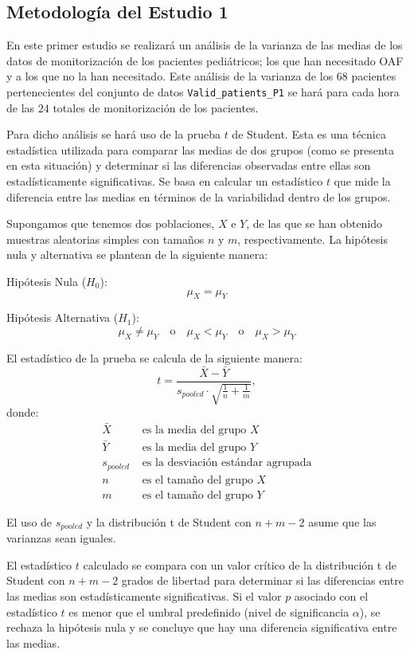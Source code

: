 \subsection{Metodología del Estudio 1}\label{sec:metodologia-estudio-1}

En este primer estudio se realizará un análisis de la varianza de las medias de los datos de monitorización de los pacientes pediátricos; los que han necesitado OAF y a los que no la han necesitado. Este análisis de la varianza de los $68$ pacientes pertenecientes del conjunto de datos \texttt{Valid\_patients\_P1} se hará para cada hora de las $24$ totales de monitorización de los pacientes.

Para dicho análisis se hará uso de la prueba $t$ de Student. Esta es una técnica estadística utilizada para comparar las medias de dos grupos (como se presenta en esta situación) y determinar si las diferencias observadas entre ellas son estadísticamente significativas. Se basa en calcular un estadístico $t$ que mide la diferencia entre las medias en términos de la variabilidad dentro de los grupos.

Supongamos que tenemos dos poblaciones, $X$ e $Y$, de las que se han obtenido muestras aleatorias simples con tamaños $n$ y $m$, respectivamente. La hipótesis nula y alternativa se plantean de la siguiente manera:

Hipótesis Nula ($H_0$):
\[
\mu_X = \mu_Y
\]

Hipótesis Alternativa ($H_1$):
\[
\mu_X \neq \mu_Y \quad \text{o} \quad \mu_X < \mu_Y \quad \text{o} \quad \mu_X > \mu_Y
\]

El estadístico de la prueba se calcula de la siguiente manera:
\[
t = \frac{\bar{X} - \bar{Y}}{s_{pooled} \cdot \sqrt{\frac{1}{n} + \frac{1}{m}}},
\]
donde:
\begin{align*}
\bar{X} & \text{ es la media del grupo } X \\
\bar{Y} & \text{ es la media del grupo } Y \\
s_{pooled} & \text{ es la desviación estándar agrupada} \\
n & \text{ es el tamaño del grupo } X \\
m & \text{ es el tamaño del grupo } Y
\end{align*}

{\color{blue} El uso de $s_{pooled}$ y la distribución t de Student con $n+m-2$ asume que las varianzas sean iguales.}

El estadístico $t$ calculado se compara con un valor crítico de la distribución t de Student con $n+m-2$ grados de libertad para determinar si las diferencias entre las medias son estadísticamente significativas. Si el valor $p$ asociado con el estadístico $t$ es menor que el umbral predefinido (nivel de significancia $\alpha$), se rechaza la hipótesis nula y se concluye que hay una diferencia significativa entre las medias.

